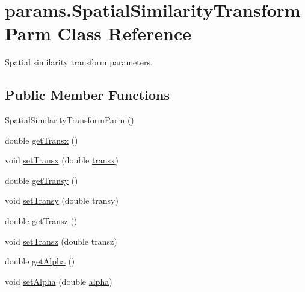 \hypertarget{classparams_1_1_spatial_similarity_transform_parm}{}\section{params.\+Spatial\+Similarity\+Transform\+Parm Class Reference}
\label{classparams_1_1_spatial_similarity_transform_parm}


Spatial similarity transform parameters.  


\subsection*{Public Member Functions}
\begin{DoxyCompactItemize}
\item 
\hyperlink{classparams_1_1_spatial_similarity_transform_parm_a99b66f5f68f75d9a24a2e25455b18817}{Spatial\+Similarity\+Transform\+Parm} ()
\item 
double \hyperlink{classparams_1_1_spatial_similarity_transform_parm_a37fd744ccbc74031df2da8f098815332}{get\+Transx} ()
\item 
void \hyperlink{classparams_1_1_spatial_similarity_transform_parm_aba92ce1ddf711516948e45ac4f324d2b}{set\+Transx} (double \hyperlink{classparams_1_1_spatial_similarity_transform_parm_aca67c037fdd9703e00d1b2a01e4c34b7}{transx})
\item 
double \hyperlink{classparams_1_1_spatial_similarity_transform_parm_aad089a34d066807c564cd52d38a6eb1d}{get\+Transy} ()
\item 
void \hyperlink{classparams_1_1_spatial_similarity_transform_parm_a95abfe42f6dbacca540045bd351e2f8a}{set\+Transy} (double transy)
\item 
double \hyperlink{classparams_1_1_spatial_similarity_transform_parm_a1a1bdcbebcd6d163e10ca26adfdc38af}{get\+Transz} ()
\item 
void \hyperlink{classparams_1_1_spatial_similarity_transform_parm_ae24da150263352bbf42c86eb994b3e92}{set\+Transz} (double transz)
\item 
double \hyperlink{classparams_1_1_spatial_similarity_transform_parm_a216da0bc2f6cbb4ed137e2146527b42b}{get\+Alpha} ()
\item 
void \hyperlink{classparams_1_1_spatial_similarity_transform_parm_ae5ed35054bccb93612ed02174c83ad2c}{set\+Alpha} (double \hyperlink{classparams_1_1_spatial_similarity_transform_parm_a4f23eb3e8b5fc1b10958fd60b6484a77}{alpha})
\item 

\end{DoxyCompactItemize}
